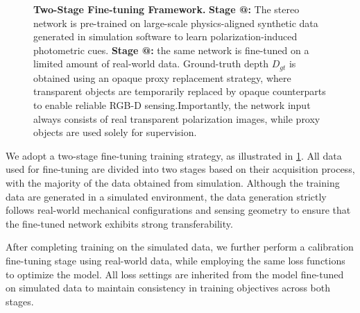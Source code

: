 \documentclass[letterpaper, 10 pt, conference]{ieeeconf}  %
\makeatletter
\newcommand{\Rmnum}[1]{\expandafter\@slowromancap\romannumeral #1@}
\makeatother
\begin{document}
\begin{figure}[h!]
\caption{\textbf{Two-Stage Fine-tuning Framework.} 
\textbf{Stage \Rmnum{1}:} The stereo network is pre-trained on large-scale physics-aligned synthetic data generated in simulation software to learn polarization-induced photometric cues.
\textbf{Stage \Rmnum{2}:} the same network is fine-tuned on a limited amount of real-world data.
Ground-truth depth $D_{gt}$ is obtained using an opaque proxy replacement strategy, where transparent objects are temporarily replaced by opaque counterparts to enable reliable RGB-D sensing.Importantly, the network input always consists of real transparent polarization images, while proxy objects are used solely for supervision.}
\label{fig:fine_tuning_pipeline}
\end{figure}
We adopt a two-stage fine-tuning training strategy, as illustrated in \cref{fig:fine_tuning_pipeline}.
All data used for fine-tuning are divided into two stages based on their acquisition process, with the majority of the data obtained from simulation.
Although the training data are generated in a simulated environment, the data generation strictly follows real-world mechanical configurations and sensing geometry to ensure that the fine-tuned network exhibits strong transferability.

After completing training on the simulated data, we further perform a calibration fine-tuning stage using real-world data, while employing the same loss functions to optimize the model.
All loss settings are inherited from the model fine-tuned on simulated data to maintain consistency in training objectives across both stages.
\end{document}
